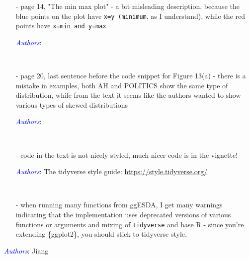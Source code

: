 \documentclass[11pt]{article}
\newcommand{\authors}[1]{

 \parbox{15cm}{\textcolor{blue}{\it Authors}: \color{red}#1}
 \\ \vspace{0.3cm}
}
\begin{document}
\begin{itemize}
\item[-] page 14, "The min max plot" - a bit misleading description, because the blue points on the plot have {\tt x=y (minimum}, as I understand), while the red points have {\tt x=min and y=max}
\authors{}

\item[-] page 20, last sentence before the code snippet for Figure 13(a) - there is a mistake in examples, both AH and POLITICS show the same type of distribution, while from the text it seems like the authors wanted to show various types of skewed distributions
\authors{}


\item[-] code in the text is not nicely styled, much nicer code is in the vignette!
\authors{The tidyverse style guide: \url{https://style.tidyverse.org/}}


\item[-] when running many functions from ggESDA, I get many warnings indicating that the implementation uses deprecated versions of various functions or arguments and mixing of {\tt tidyverse} and base R - since you're extending \{ggplot2\}, you should stick to tidyverse style.
\end{itemize}
\authors{Jiang}


\end{document}

